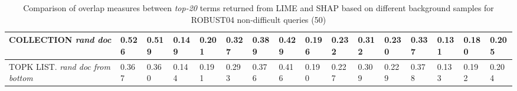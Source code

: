 \begin{table}
{\begin{tabular}{ |m{6em}|m{2em}|m{2em}|m{2em}|m{2em}|m{2.8em}||m{2em}|m{2em}|m{2em}|m{2em}|m{2.8em}||m{2em}|m{2em}|m{2em}|m{2em}|m{2.8em}|| }


COLLECTION \newline \textit{rand doc} & 0.526 & 0.519 & 0.149 & 0.201 & 0.327 & 0.389 & 0.429 & 0.196 & 0.232 & 0.312 & 0.230 & 0.337 & 0.131 & 0.180 & 0.205\\
\hline

TOPK LIST. \newline \textit{rand doc from bottom} & 0.367 & 0.360 & 0.144 & 0.191 & 0.293 & 0.376 & 0.416 & 0.190 & 0.227 & 0.309 & 0.229 & 0.378 & 0.133 & 0.192 & 0.204\\
\hline
 \end{tabular}}
\caption{Comparison of overlap measures between \textit{top-20} terms returned from LIME and SHAP based on different background samples for ROBUST04 non-difficult queries (50)}
\label{table_norm_20_terms}
\end{table}

